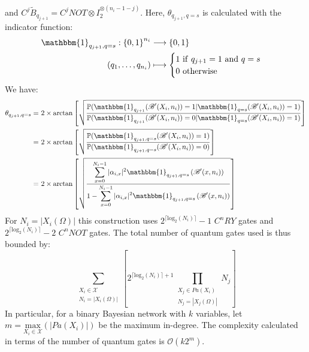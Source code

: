 and 
$C^j\tilde{B}_{q_{j+1}} = C^jNOT \otimes I_2^{\otimes (n_i-1-j)}$. 
Here, $\theta_{q_{j+1}, q=s}$ is calculated with the indicator function:
\begin{align*}
    \mathbbm{1}_{q_{j+1}, q=s} : {\{0,1\}}^{n_i} &\longrightarrow \{0,1\} \\
    (q_1, \hdots ,q_{n_i}) &\longmapsto
 \begin{cases}
 1 \ \mathrm{if} \ q_{j+1} = 1 \ \mathrm{and} \ q=s\\
 0 \ \mathrm{otherwise}
 \end{cases}
\end{align*}
We have:
\begin{align*}
    \theta_{q_{j+1}, q=s} =&\ 2\times\mathrm{arctan}\left[\sqrt{\frac{\displaystyle \mathbb{P}(\mathbbm{1}_{q_{j+1}}(\mathscr{B}'(X_i,n_i))=1|\mathbbm{1}_{q=s}(\mathscr{B}'(X_i,n_i))=1)}{\displaystyle \mathbb{P}(\mathbbm{1}_{q_{j+1}}(\mathscr{B}'(X_i,n_i))=0|\mathbbm{1}_{q=s}(\mathscr{B}'(X_i,n_i))=1)}}\right] \\
    =&\ 2\times\mathrm{arctan}\left[\sqrt{\frac{\displaystyle \mathbb{P}(\mathbbm{1}_{q_{j+1}, q=s}(\mathscr{B}'(X_i,n_i))=1)}{\displaystyle \mathbb{P}(\mathbbm{1}_{q_{j+1}, q=s}(\mathscr{B}'(X_i,n_i))=0)}}\right] \\
    =&\ 2\times\mathrm{arctan}\left[\sqrt{\frac{\displaystyle \sum_{x=0}^{N_i-1}|\alpha_{i,x}|^2\mathbbm{1}_{q_{j+1}, q=s}\left(\mathscr{B}'(x,n_i)\right)}{\displaystyle 1-\sum_{x=0}^{N_i-1}|\alpha_{i,x}|^2\mathbbm{1}_{q_{j+1}, q=s}\left(\mathscr{B}'(x,n_i)\right)}}\right]
\end{align*}
For $N_i=|X_i(\Omega)|$ this construction uses $2^{\lceil \mathrm{log}_2(N_i) \rceil}-1$ $C^nRY$ gates and $2^{\lceil \mathrm{log}_2(N_i) \rceil}-2$ $C^nNOT$ gates.
The total number of quantum gates used is thus bounded by:
\[\sum_{\substack{X_i \in \mathcal{X} \\ N_i = |X_i(\Omega)|}}
\left[
2^{\lceil \mathrm{log}_2(N_i)\rceil+1} \prod_{\substack{X_j\in Pa(X_i) \\ N_j = |X_j(\Omega)|}}N_j 
\right] 
\]
In particular, for a binary Bayesian network with $k$ variables, let $m = \underset{X_i\in\mathcal{X}}{\mathrm{max}}(|Pa(X_i)|)$ be the maximum in-degree. The complexity calculated in terms of the number of quantum gates is $\mathcal{O}(k2^m)$.
